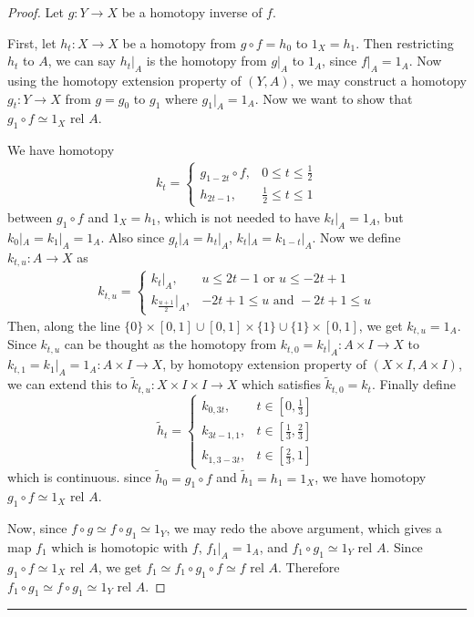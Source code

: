 \begin{proof}
Let $g:Y\rightarrow X$ be a homotopy inverse of $f$.

First, let $h_t:X\rightarrow X$ be a homotopy from $g\circ f=h_0$ to $1_X=h_1$. Then restricting $h_t$ to $A$, we can say $h_t|_A$ is the homotopy from $g|_A$ to $1_A$, since $f|_A=1_A$. Now using the homotopy extension property of $(Y,A)$, we may construct a homotopy $g_t:Y\rightarrow X$ from $g=g_0$ to $g_1$ where $g_1|_A=1_A$. Now we want to show that $g_1\circ f\simeq 1_X \textrm{ rel } A$.

We have homotopy
\begin{align*}
k_t=\begin{cases}
g_{1-2t}\circ f,&0\leq t\leq \frac{1}{2}\\
h_{2t-1},&\frac{1}{2}\leq t \leq 1
\end{cases}
\end{align*}
between $g_1\circ f$ and $1_X=h_1$, which is not needed to have $k_t|_A=1_A$, but $k_0|_A=k_1|_A=1_A$. Also since $g_t|_A=h_t|_A$, $k_t|_A=k_{1-t}|_A$. Now we define $k_{t,u}:A\rightarrow X$ as
\begin{align*}
k_{t,u}=\begin{cases}
k_{t}|_A, & u\leq 2t-1 \textrm{ or } u\leq -2t+1\\
k_{\frac{u+1}{2}}|_A, & -2t+1\leq u \textrm{ and } -2t+1\leq u
\end{cases}
\end{align*}
Then, along the line $\{0\}\times [0,1]\cup [0,1]\times \{1\}\cup \{1\}\times [0,1]$, we get $k_{t,u}=1_A$. Since $k_{t,u}$ can be thought as the homotopy from $k_{t,0}=k_t|_A:A\times I\rightarrow X$ to $k_{t,1}=k_1|_A=1_A:A\times I\rightarrow X$, by homotopy extension property of $(X\times I,A\times I)$, we can extend this to $\tilde{k}_{t,u}:X\times I\times I\rightarrow X$ which satisfies $\tilde{k}_{t,0}=k_t$. Finally define
\begin{equation}
\tilde{h}_t=\begin{cases}
k_{0,3t},&t\in [0,\frac{1}{3}]\\
k_{3t-1,1},&t\in [\frac{1}{3},\frac{2}{3}]\\
k_{1,3-3t},&t\in [\frac{2}{3},1]
\end{cases}
\end{equation}
which is continuous. since $\tilde{h}_0=g_1\circ f$ and $\tilde{h}_1=h_1=1_X$, we have homotopy $g_1\circ f \simeq 1_X \textrm{ rel } A$.

Now, since $f\circ g\simeq f\circ g_1\simeq 1_Y$, we may redo the above argument, which gives a map $f_1$ which is homotopic with $f$, $f_1|_A=1_A$, and $f_1\circ g_1\simeq 1_Y \textrm{ rel } A$. Since $g_1\circ f\simeq 1_X \textrm{ rel }A$, we get $f_1\simeq f_1\circ g_1\circ f \simeq f \textrm{ rel }A$. Therefore $f_1\circ g_1\simeq f\circ g_1\simeq 1_Y \textrm{ rel }A$.
\end{proof}
\noindent\rule{\textwidth}{1pt}
\newline